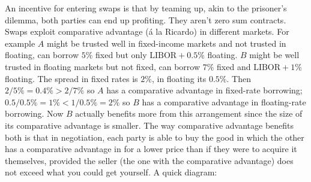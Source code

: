 \documentclass[9pt]{extarticle}
\begin{document}
An incentive for entering swaps is that by teaming up, akin to the prisoner's dilemma, both 
parties can end up profiting. They aren't zero sum contracts. Swaps exploit comparative advantage (\'a la Ricardo) 
in different markets. For example $A$ might be trusted well in fixed-income markets and not trusted 
in floating, can borrow $5\%$ fixed but only $\text{LIBOR}+0.5\%$ floating. $B$ might be well 
trusted in floating markets but not fixed, can borrow $7\%$ fixed and $\text{LIBOR} +1\%$ floating.
The spread in fixed rates is $2\%$, in floating its $0.5\%$. Then $2/5\% = 0.4 \% > 2/7\%$ so 
$A$ has a comparative advantage in fixed-rate borrowing; $0.5/0.5\%=1\%<1/0.5\% = 2\%$ so 
$B$ has a comparative advantage in floating-rate borrowing. Now $B$ actually benefits 
more from this arrangement since the size of its comparative advantage is smaller. The way 
comparative advantage benefits both is that in negotiation, each party 
is able to buy the good in which the other has a comparative advantage in for a lower 
price than if they were to acquire it themselves, provided the seller (the one 
with the comparative advantage) does not exceed what you could get yourself. A quick diagram:
\begin{center}
\end{center}
\end{document}
